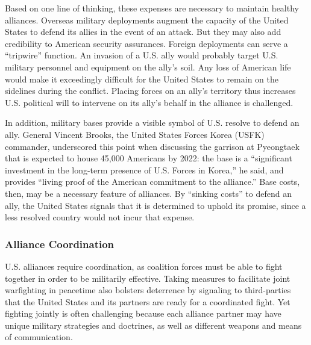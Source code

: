 Based on one line of thinking, these expenses are necessary to maintain healthy alliances.  Overseas military deployments augment the capacity of the United States to defend its allies in the event of an attack. But they may also add credibility to American security assurances. Foreign deployments can serve a ``tripwire'' function. An invasion of a U.S. ally would probably target U.S. military personnel and equipment on the ally's soil. Any loss of American life would make it exceedingly difficult for the United States to remain on the sidelines during the conflict. Placing forces on an ally's territory thus increases U.S. political will to intervene on its ally's behalf in the alliance is challenged.\autocite[47]{schellingarms66} %

In addition, military bases provide a visible symbol of U.S. resolve to defend an ally.\autocite[7]{cooleybase08} General Vincent Brooks, the United States Forces Korea (USFK) commander, underscored this point when discussing the garrison at Pyeongtaek that is expected to house 45,000 Americans by 2022: the base is a ``significant investment in the long-term presence of U.S. Forces in Korea,'' he said, and provides ``living proof of the American commitment to the alliance.''\autocite[Quoted in][]{hincksT18} Base costs, then, may be a necessary feature of alliances. By ``sinking costs'' to defend an ally, the United States signals that it is determined to uphold its promise, since a less resolved country would not incur that expense.\autocite{Fearon1997,FuhrmannSechser2014}


\subsubsection*{Alliance Coordination}

U.S. alliances require coordination, as coalition forces must be able to fight together in order to be militarily effective.\autocite[On the challenges of military coalitions, see, for example,][]{krepscoalitions11,wolfordpolitics16} Taking measures to facilitate joint warfighting in peacetime also bolsters deterrence by signaling to third-parties that the United States and its partners are ready for a coordinated fight.\autocite[2]{poastarguing19} Yet fighting jointly is often challenging because each alliance partner may have unique military strategies and doctrines, as well as different weapons and means of communication.\autocite{lingreenbergTNSR20}

